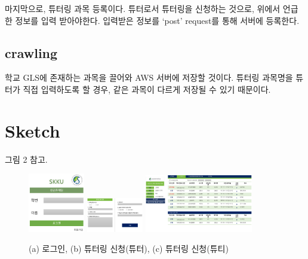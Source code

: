 \documentclass{lxaiproposal}
\begin{document}
마지막으로, 튜터링 과목 등록이다. 튜터로서 튜터링을 신청하는 것으로, 위에서 언급한 정보를 입력 받아야한다. 입력받은 정보를 `post' request를 통해 서버에 등록한다. 

\subsection{crawling}
학교 GLS에 존재하는 과목을 끌어와 AWS 서버에 저장할 것이다. 튜터링 과목명을 튜터가 직접 입력하도록 할 경우, 같은 과목이 다르게 저장될 수 있기 때문이다. 


\section{Sketch}
그림 2 참고.

\begin{figure}
    \includegraphics[width = 0.22\textwidth]{Fig2.png}
    \includegraphics[width = 0.22\textwidth]{Fig3.png}
    \includegraphics[width = 0.42\textwidth]{Fig4.png}
    \caption{(a) 로그인, (b) 튜터링 신청(튜터), (c) 튜터링 신청(튜티)}
\end{figure}


% 
% 

\end{document}
